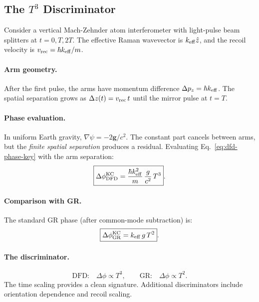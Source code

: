 \subsection{The $T^3$ Discriminator}\label{sec:mw-t3}

Consider a vertical Mach-Zehnder atom interferometer with light-pulse beam splitters at $t = 0, T, 2T$. The effective Raman wavevector is $k_{\rm eff}\hat{z}$, and the recoil velocity is $v_{\rm rec} = \hbar k_{\rm eff}/m$.

\paragraph{Arm geometry.}
After the first pulse, the arms have momentum difference $\Delta p_z = \hbar k_{\rm eff}$. The spatial separation grows as $\Delta z(t) = v_{\rm rec}\, t$ until the mirror pulse at $t = T$.

\paragraph{Phase evaluation.}
In uniform Earth gravity, $\nabla\psi = -2\mathbf{g}/c^2$. The constant part cancels between arms, but the \textit{finite spatial separation} produces a residual. Evaluating Eq.~\eqref{eq:dfd-phase-key} with the arm separation:
\begin{equation}\label{eq:dfd-t3}
\boxed{\Delta\phi_{\rm DFD}^{\rm KC} = \frac{\hbar k_{\rm eff}^2}{m}\,\frac{g}{c^2}\,T^3}.
\end{equation}

\paragraph{Comparison with GR.}
The standard GR phase (after common-mode subtraction) is:
\begin{equation}\label{eq:gr-t2}
\boxed{\Delta\phi_{\rm GR}^{\rm KC} = k_{\rm eff}\, g\, T^2}.
\end{equation}

\paragraph{The discriminator.}
\begin{equation}
\text{DFD:} \quad \Delta\phi \propto T^3, \qquad \text{GR:} \quad \Delta\phi \propto T^2.
\end{equation}
The time scaling provides a clean signature. Additional discriminators include orientation dependence and recoil scaling.

